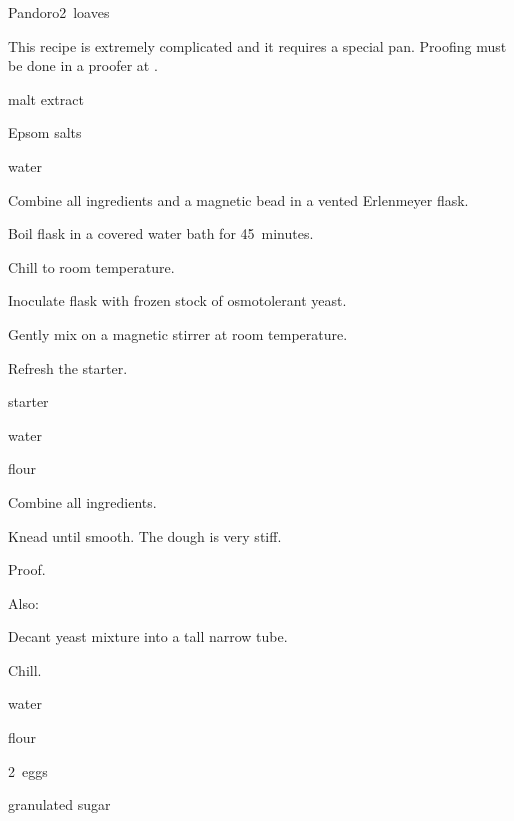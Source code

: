 \begin{recipe}{Pandoro}{}{2~loaves}

This recipe is extremely complicated and it requires a special pan. Proofing must be done in a proofer at .

\begin{ingredients}
\item {} malt extract
\item {} Epsom salts
\item {} water
\end{ingredients}

\begin{directions}
\item Combine all ingredients and a magnetic bead in a vented  Erlenmeyer flask.
\item Boil flask in a covered water bath for 45~minutes.
\item Chill to room temperature.
\item Inoculate flask with frozen stock of osmotolerant yeast.
\item Gently mix on a magnetic stirrer at room temperature.
\end{directions}

Refresh the starter.

\begin{ingredients}
\item {} starter
\item {} water
\item {} flour
\end{ingredients}

\begin{directions}
\item Combine all ingredients.
\item Knead until smooth. The dough is very stiff.
\item Proof.
\end{directions}

Also:

\begin{directions}
\item Decant yeast mixture into a tall narrow tube.
\item Chill.
\end{directions}

\begin{ingredients}
\item {} water
\item {} flour
\item 2~eggs
\item {} granulated sugar
\end{ingredients}


\end{recipe}
